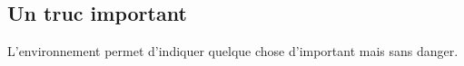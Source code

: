 

\usepackage[lang = french]{../main/main}
\usepackage{../macroenv/macroenv}
\usepackage{../showcase/showcase}
\usepackage{../listing/listing}
\usepackage{../inenglish/inenglish}


\usepackage{focus}





\subsection{Un truc important}

L'environnement  permet d'indiquer quelque chose d'important mais sans danger.



